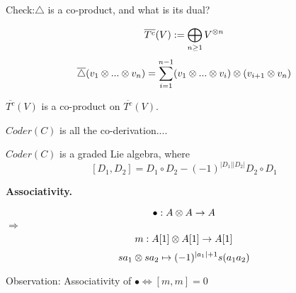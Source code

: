 Check:$\triangle$ is a co-product, and what is its dual?

\begin{example}
$$\overline{T^c}(V):=\bigoplus_{n\geq 1}V^{\otimes n}$$
$$\overline{\triangle}(v_1\otimes...\otimes v_n)
=
\sum_{i=1}^{n-1}(v_1\otimes...\otimes v_i)\otimes(v_{i+1}\otimes v_n)$$

$\overline{T^c}(V)$ is a co-product on $\overline{T^c}(V)$.
\end{example}

$Coder(C)$ is all the co-derivation....

\begin{prop}
$Coder(C)$ is a graded Lie algebra, where
$$[D_1,D_2]=D_1\circ D_2-(-1)^{|D_1||D_2|}D_2\circ D_1$$
\end{prop}

\textbf{Associativity.}

$$\bullet:A\otimes A\to A$$
$\Longrightarrow$
$$m:A[1]\otimes A[1]\to A[1]$$
$$sa_1\otimes sa_2\mapsto(-1)^{|a_1|+1}s(a_1a_2)$$

Observation:
Associativity of $\bullet\Longleftrightarrow[m,m]=0$








